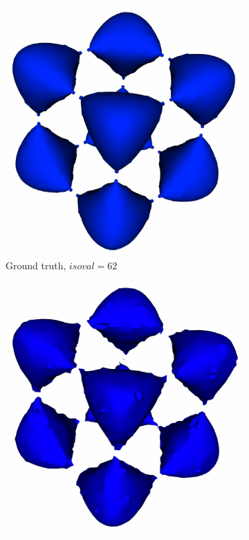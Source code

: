 \begin{figure}[!h]
\begin{subfigure}{0.195\linewidth}
\centering
\includegraphics[width=0.8\linewidth]{Images/Tangle/gt.pdf}
\vspace{-2mm}
\caption{Ground truth, $isoval=62$}
\label{fig:tangle_gt}
\end{subfigure}
\begin{subfigure}{0.195\linewidth}
\centering
\includegraphics[width=0.8\linewidth]{Images/Tangle/zls.pdf}

\end{subfigure}
\end{figure}
